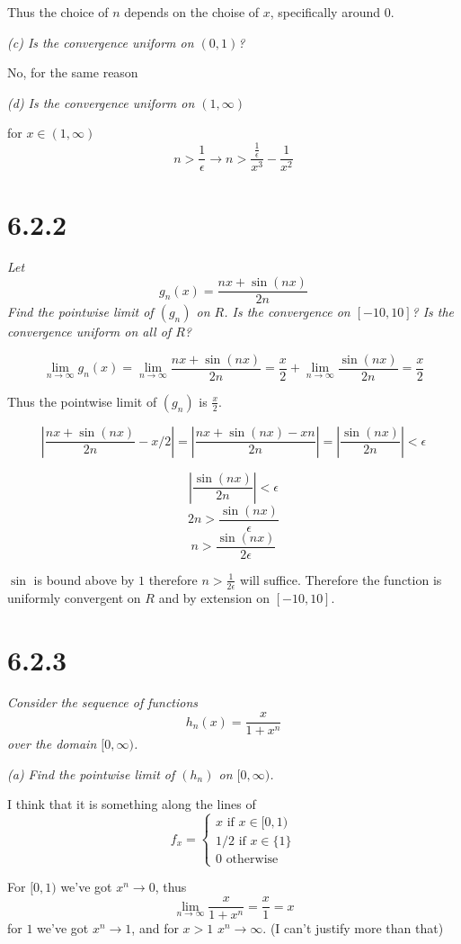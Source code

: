 \documentclass[11pt,oneside,titlepage]{book}
\begin{document}
Thus the choice of $n$ depends on the choise of $x$, specifically around
0.

\textit{(c) Is the convergence uniform on $(0, 1)$?}

No, for the same reason

\textit{(d) Is the convergence uniform on $(1, \infty)$}

for $x \in (1, \infty)$
$$n > \frac{1}{\epsilon} \to n > \frac{\frac{1}{\epsilon}}{x^3} - \frac{1}{x^2}$$


\section*{6.2.2}
\textit{Let}
$$g_n(x) = \frac{nx + \sin{(nx)}}{2n}$$
\textit{Find the pointwise limit of $(g_n)$ on $R$. Is the convergence on
  $[-10, 10]$? Is the convergence uniform on all of $R$?}

$$\lim_{n \to \infty}{g_n(x)} = \lim_{n \to \infty}\frac{nx + \sin{(nx)}}{2n}
= \frac{x}{2} + \lim_{n \to \infty}\frac{\sin{(nx)}}{2n} = \frac{x}{2}$$

Thus the pointwise limit of $(g_n)$ is $\frac{x}{2}$.

$$|\frac{nx + \sin{(nx)}}{2n} - x/2| =
|\frac{nx + \sin{(nx)} - xn}{2n} | =
|\frac{\sin{(nx)}}{2n} | < \epsilon$$

$$|\frac{\sin{(nx)}}{2n} | < \epsilon$$
$$2n  > \frac{\sin{(nx)}}{\epsilon}$$
$$n  > \frac{\sin{(nx)}}{2\epsilon}$$

$\sin$ is bound above by $1$ therefore $n > \frac{1}{2\epsilon}$ will suffice.
Therefore the function is uniformly convergent on $R$ and by
extension on $[-10, 10]$.

\section*{6.2.3}
\textit{Consider the sequence of functions}
$$h_n(x) = \frac{x}{1 + x^n}$$
\textit{over the domain $[0, \infty)$.}

\textit{(a) Find the pointwise limit of $(h_n)$ on $[0, \infty)$.}

I think that it is something along the lines of
$$
f_x =
\begin{cases}
  x \text{ if } x \in [0, 1) \\
  1/2 \text{ if } x \in \{1\} \\
  0 \text{ otherwise }
\end{cases}
$$

For $[0, 1)$ we've got $x^n \to 0$, thus
$$\lim_{n \to \infty}{\frac{x}{1 + x^n}} = \frac{x}{1} = x$$
for $1$ we've got $x^n \to 1$, and for $x > 1$ $x^n \to \infty$.
(I can't justify more than that)
\end{document}
